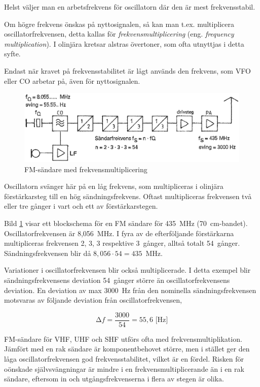 Helst väljer man en arbetsfrekvens för oscillatorn där den är mest
frekvensstabil.

Om högre frekvens önskas på nyttosignalen, så kan man
t.ex. multiplicera oscillatorfrekvensen, detta kallas för
\emph{frekvensmultiplicering} (eng. \emph{frequency multiplication}).
I olinjära kretsar alstras övertoner, som ofta utnyttjas i detta syfte.

Endast när kravet på frekvensstabilitet är lågt används den frekvens,
som VFO eller CO arbetar på, även för nyttosignalen.

\begin{figure}
  \includegraphics[width=\textwidth]{images/cropped_pdfs/bild_2_5-03.pdf}
  \caption{FM-sändare med frekvensmultiplicering}
  \label{fig:bildII5-3}
\end{figure}

Oscillatorn svänger här på en låg frekvens, som multipliceras i
olinjära förstärkarsteg till en hög sändningsfrekvens.
Oftast multipliceras frekvensen två eller tre gånger i vart och ett av
förstärkarstegen.

Bild \ref{fig:bildII5-3} visar ett blockschema för en FM sändare för
435~MHz (70~cm-bandet).
Oscillatorfrekvensen är 8,056~MHz.
I fyra av de efterföljande förstärkarna multipliceras frekvensen 2, 3, 3
respektive 3~gånger, alltså totalt 54~gånger.
Sändningsfrekvensen blir då \(8,056 \cdot 54 = 435\)~MHz.

Variationer i oscillatorfrekvensen blir också multiplicerade.
I detta exempel blir sändningsfrekvensens deviation 54~gånger större än
oscillatorfrekvensens deviation.
En deviation av max 3000~Hz från den nominella sändningsfrekvensen motsvaras
av följande deviation från oscillatorfrekvensen,

\[∆f = \frac{3000}{54} = 55,6\text{ [Hz]}\]

FM-sändare för VHF, UHF och SHF utförs ofta med
frekvensmultiplikation.
Jämfört med en rak sändare är komponentbehovet större, men i stället ger
den låga oscillatorfrekvensen god frekvensstabilitet, vilket är en fördel.
Risken för oönskade självsvängningar är mindre i en frekvensmultiplicerande
än i en rak sändare, eftersom in och utgångsfrekvenserna i flera av stegen är
olika.

